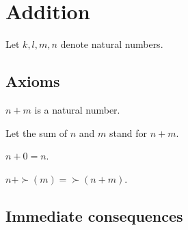 \documentclass[../../natural-numbers.ftl.tex]{subfiles}
\begin{document}
  \section{Addition}

  \begin{forthel}
  \end{forthel}

  \begin{forthel}
    Let $k, l, m, n$ denote natural numbers.
  \end{forthel}


  \subsection{Axioms}

  \begin{forthel}
    \begin{signature}
      $n + m$ is a natural number.
    \end{signature}

    Let the sum of $n$ and $m$ stand for $n + m$.

    \begin{axiom}\label{Arithmetic_01_02_190669}
      $n + 0 = n$.
    \end{axiom}

    \begin{axiom}\label{Arithmetic_01_02_110889}
      $n + \succ(m) = \succ(n + m)$.
    \end{axiom}
  \end{forthel}


  \subsection{Immediate consequences}
\end{document}
